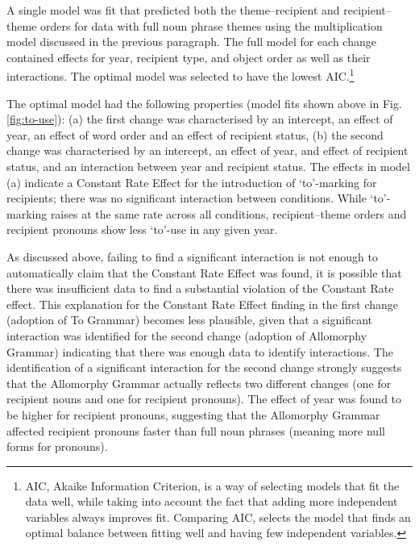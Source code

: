 	A single model was fit that predicted both the theme--recipient and recipient--theme orders for data with full noun phrase themes using the multiplication model discussed in the previous paragraph. The full model for each change contained effects for year, recipient type, and object order as well as their interactions. The optimal model was selected to have the lowest AIC.\footnote{AIC, Akaike Information Criterion, is a way of selecting models that fit the data well, while taking into account the fact that adding more independent variables always improves fit. Comparing AIC, selects the model that finds an optimal balance between fitting well and having few independent variables.} 
	
	The optimal model had the following properties (model fits shown above in Fig. \ref{fig:to-use}): (a) the first change was characterised by an intercept, an effect of year, an effect of word order and an effect of recipient status, (b) the second change was characterised by an intercept, an effect of year, and effect of recipient status, and an interaction between year and recipient status. The effects in model (a) indicate a Constant Rate Effect for the introduction of `to'-marking for recipients; there was no significant interaction between conditions. While `to'-marking raises at the same rate across all conditions, recipient--theme orders and recipient pronouns show less `to'-use in any given year. 
	
	As discussed above, failing to find a significant interaction is not enough to automatically claim that the Constant Rate Effect was found, it is possible that there was insufficient data to find a substantial violation of the Constant Rate effect. This explanation for the Constant Rate Effect finding in the first change (adoption of To Grammar) becomes less plausible, given that a significant interaction was identified for the second change (adoption of Allomorphy Grammar) indicating that there was enough data to identify interactions. The identification of a significant interaction for the second change strongly suggests that the Allomorphy Grammar actually reflects two different changes (one for recipient nouns and one for recipient pronouns). The effect of year was found to be higher for recipient pronouns, suggesting that the Allomorphy Grammar affected recipient pronouns faster than full noun phrases (meaning more null forms for pronouns).
	

